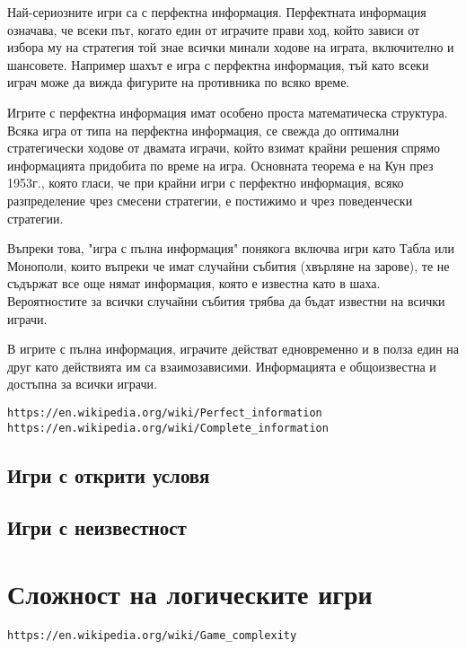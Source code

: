 Най-сериозните игри са с перфектна информация. Перфектната информация означава, че всеки път, когато един от играчите прави ход, който зависи от избора му на стратегия той знае всички минали ходове на играта, включително и шансовете. Например шахът е игра с перфектна информация, тъй като всеки играч може да вижда фигурите на противника по всяко време. 

Игрите с перфектна информация имат особено проста математическа структура. Всяка игра от типа на перфектна информация, се свежда до оптимални стратегически ходове от двамата играчи, който взимат крайни решения спрямо информацията придобита по време на игра. Основната теорема е на Кун през 1953г., която гласи, че при крайни игри с перфектно информация, всяко разпределение чрез смесени стратегии, е постижимо и чрез поведенчески стратегии.

Въпреки това, "игра с пълна информация" понякога включва игри като Табла или Монополи, които въпреки че имат случайни събития (хвърляне на зарове), те не съдържат все още нямат информация, която е известна като в шаха. Вероятностите за всички случайни събития трябва да бъдат известни на всички играчи.

В игрите с пълна информация, играчите действат едновременно и в полза един на друг като действията им са взаимозависими. Информацията е общоизвестна и достъпна за всички играчи.

\begin{lstlisting}
https://en.wikipedia.org/wiki/Perfect_information
https://en.wikipedia.org/wiki/Complete_information
\end{lstlisting}

\subsection{Игри с открити условя}

\subsection{Игри с неизвестност}

\section{Сложност на логическите игри}

\begin{lstlisting}
https://en.wikipedia.org/wiki/Game_complexity
\end{lstlisting}

